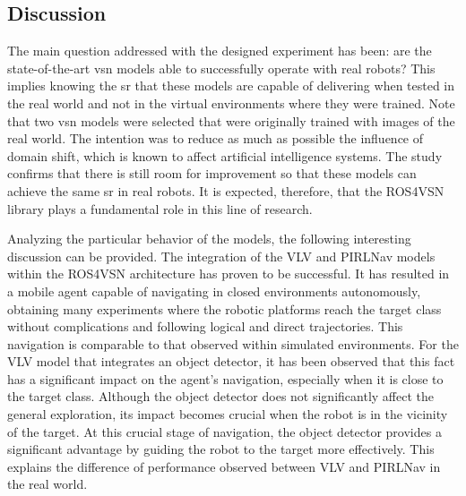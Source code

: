 \subsection{Discussion}
\label{subsec:discussion}
The main question addressed with the designed experiment has been: are the state-of-the-art \acrshort{vsn} models able to successfully operate with real robots?
This implies knowing the \acrshort{sr} that these models are capable of delivering when tested in the real world and not in the virtual environments where they were trained.
Note that two \acrshort{vsn} models were selected that were originally trained with images of the real world.
The intention was to reduce as much as possible the influence of domain shift, which is known to affect artificial intelligence systems.
The study confirms that there is still room for improvement so that these models can achieve the same \acrshort{sr} in real robots.
It is expected, therefore, that the ROS4VSN library plays a fundamental role in this line of research.

Analyzing the particular behavior of the models, the following interesting discussion can be provided.
The integration of the VLV and PIRLNav models within the ROS4VSN architecture has proven to be successful.
It has resulted in a mobile agent capable of navigating in closed environments autonomously, obtaining many experiments where the robotic platforms reach the target class without complications and following logical and direct trajectories.
This navigation is comparable to that observed within simulated environments.
For the VLV model that integrates an object detector, it has been observed that this fact has a significant impact on the agent's navigation, especially when it is close to the target class.
Although the object detector does not significantly affect the general exploration, its impact becomes crucial when the robot is in the vicinity of the target.
At this crucial stage of navigation, the object detector provides a significant advantage by guiding the robot to the target more effectively.
This explains the difference of performance observed between VLV and PIRLNav in the real world.

